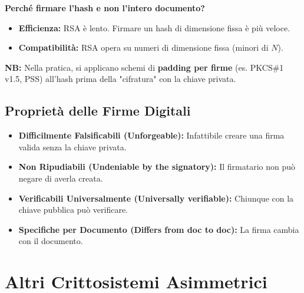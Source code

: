 \documentclass{article}
\begin{document}
\textbf{Perché firmare l'hash e non l'intero documento?}
\begin{itemize}
    \item \textbf{Efficienza:} RSA è lento. Firmare un hash di dimensione fissa è più veloce.
    \item \textbf{Compatibilità:} RSA opera su numeri di dimensione fissa (minori di $N$).
\end{itemize}
\textbf{NB:} Nella pratica, si applicano schemi di \textbf{padding per firme} (es. PKCS\#1 v1.5, PSS) all'hash prima della "cifratura" con la chiave privata.

\subsection{Proprietà delle Firme Digitali}
\begin{itemize}
    \item \textbf{Difficilmente Falsificabili (Unforgeable):} Infattibile creare una firma valida senza la chiave privata.
    \item \textbf{Non Ripudiabili (Undeniable by the signatory):} Il firmatario non può negare di averla creata.
    \item \textbf{Verificabili Universalmente (Universally verifiable):} Chiunque con la chiave pubblica può verificare.
    \item \textbf{Specifiche per Documento (Differs from doc to doc):} La firma cambia con il documento.
\end{itemize}

\section{Altri Crittosistemi Asimmetrici}
\end{document}
